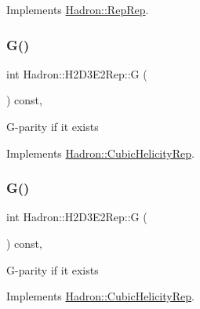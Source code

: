 Implements \mbox{\hyperlink{structHadron_1_1RepRep_a92c8802e5ed7afd7da43ccfd5b7cd92b}{Hadron\+::\+Rep\+Rep}}.

\mbox{\label{structHadron_1_1H2D3E2Rep_acf948fba347a3cbb8ca79c0bb60eaf23}} 
\subsubsection{\texorpdfstring{G()}{G()}\hspace{0.1cm}{\footnotesize\ttfamily [1/3]}}
{\footnotesize\ttfamily int Hadron\+::\+H2\+D3\+E2\+Rep\+::G (\begin{DoxyParamCaption}{ }\end{DoxyParamCaption}) const\hspace{0.3cm}{\ttfamily [inline]}, {\ttfamily [virtual]}}

G-\/parity if it exists 

Implements \mbox{\hyperlink{structHadron_1_1CubicHelicityRep_a50689f42be1e6170aa8cf6ad0597018b}{Hadron\+::\+Cubic\+Helicity\+Rep}}.

\mbox{\label{structHadron_1_1H2D3E2Rep_acf948fba347a3cbb8ca79c0bb60eaf23}} 
\subsubsection{\texorpdfstring{G()}{G()}\hspace{0.1cm}{\footnotesize\ttfamily [2/3]}}
{\footnotesize\ttfamily int Hadron\+::\+H2\+D3\+E2\+Rep\+::G (\begin{DoxyParamCaption}{ }\end{DoxyParamCaption}) const\hspace{0.3cm}{\ttfamily [inline]}, {\ttfamily [virtual]}}

G-\/parity if it exists 

Implements \mbox{\hyperlink{structHadron_1_1CubicHelicityRep_a50689f42be1e6170aa8cf6ad0597018b}{Hadron\+::\+Cubic\+Helicity\+Rep}}.

\mbox{\label{structHadron_1_1H2D3E2Rep_acf948fba347a3cbb8ca79c0bb60eaf23}} 
